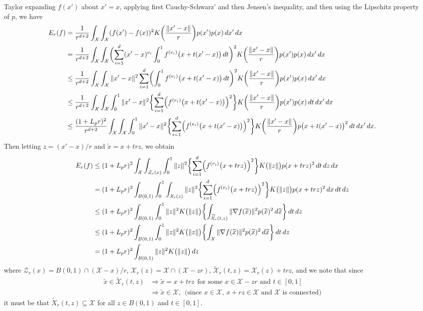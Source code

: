 \documentclass[twoside]{article}
\newcommand{\1}{\mathbf{1}}
\newcommand{\Xset}{\mathcal{X}}
\newcommand{\wt}[1]{\widetilde{#1}}
\theoremstyle{definition}
\theoremstyle{remark}
\begin{document}
Taylor expanding $f(x')$ about $x' = x$, applying first Cauchy-Schwarz' and then Jensen's inequality, and then using the Lipschitz property of $p$, we have
\begin{align*}
E_r(f) & = \frac{1}{r^{d + 2}}\int_{\Xset} \int_{\Xset} (f(x') - f(x))^2 K\biggl(\frac{\|x' - x\|}{r}\biggr) p(x') p(x) \,dx' \,dx \\
& = \frac{1}{r^{d + 2}}\int_{\Xset} \int_{\Xset} \biggl(\sum_{i = 1}^{d} (x' - x)^{e_i} \int_0^1 f^{(e_i)}\bigl(x + t(x' - x)\bigr) \,dt\biggr)^2 K\biggl(\frac{\|x' - x\|}{r}\biggr) p(x') p(x) \,dx' \,dx \\
& \leq \frac{1}{r^{d + 2}}\int_{\Xset} \int_{\Xset} \|x' - x\|^2 \sum_{i = 1}^{d}\biggl(\int_0^1 f^{(e_i)}\bigl(x + t(x' - x)\bigr) \,dt\biggr)^2 K\biggl(\frac{\|x' - x\|}{r}\biggr) p(x') p(x) \,dx' \,dx \\
& \leq \frac{1}{r^{d + 2}}\int_{\Xset} \int_{\Xset} \int_0^1   \|x' - x\|^2 \biggl\{\sum_{i = 1}^{d} \Bigl(f^{(e_i)}\bigl(x + t(x' - x)\bigr)\Bigr)^2\biggr\} K\biggl(\frac{\|x' - x\|}{r}\biggr) p(x') p(x)   \,dt   \,dx' \,dx \\
& \leq \frac{(1 + L_pr)^2}{r^{d + 2}}\int_{\Xset} \int_{\Xset} \int_0^1  \|x' - x\|^2 \biggl\{\sum_{i = 1}^{d} \Bigl(f^{(e_i)}\bigl(x + t(x' - x)\bigr)\Bigr)^2\biggr\} K\biggl(\frac{\|x' - x\|}{r}\biggr) p\bigl(x + t(x' - x)\bigr)^2   \,dt   \,dx' \,dx.
\end{align*} 
Then letting $z = (x' - x)/r$ and $\wt{x} = x + trz$, we obtain
\begin{align*}
E_r(f) & \leq (1 + L_pr)^2 \int_{\Xset} \int_{\mathcal{Z}_r(x)} \int_{0}^{1} \|z\|^2 \biggl\{\sum_{i = 1}^{d} \Bigl(f^{(e_i)}\bigl(x + trz\bigr)\Bigr)^2\biggr\} K\bigl(\|z\|\bigr) p(x + trz)^2 \,dt \,dz \,dx \\
& = (1 + L_pr)^2 \int_{B(0,1)} \int_{0}^{1}  \int_{\Xset_r(z)} \|z\|^2 \biggl\{\sum_{i = 1}^{d} \Bigl(f^{(e_i)}\bigl(x + trz\bigr)\Bigr)^2\biggr\} K\bigl(\|z\|\bigr) p(x + trz)^2 \,dx \,dt \,dz \\
& \leq (1 + L_pr)^2 \int_{B(0,1)} \int_{0}^{1} \|z\|^2 K\bigl(\|z\|\bigr) \biggl\{\int_{\wt{\Xset}_r(t,z)} \|\nabla f(\wt{x})\|^2 p(\wt{x})^2 \,d\wt{x}\biggr\} \,dt \,dz  \\
& \leq (1 + L_pr)^2 \int_{B(0,1)} \int_{0}^{1} \|z\|^2 K\bigl(\|z\|\bigr) \biggl\{\int_{\Xset} \|\nabla f(\wt{x})\|^2 p(\wt{x})^2 \,d\wt{x}\biggr\} \,dt \,dz \\
& = (1 + L_pr)^2 \int_{B(0,1)} \|z\|^2 K\bigl(\|z\|\bigr) \,dz 
\end{align*}
where $\mathcal{Z}_r(x) = B(0,1) \cap (\Xset - x)/r$, $\Xset_r(z) = \Xset \cap( \Xset - zr)$, $\wt{\Xset}_r(t,z) = \Xset_r(z) + trz$, and we note that since
\begin{align*}
\wt{x} \in \wt{\Xset}_r(t,z) & \Longrightarrow \wt{x} = x + trz ~~ \textrm{for some $x \in \Xset - zr$ and $t \in [0,1]$} \\
& \Longrightarrow \wt{x} \in \Xset,~~ \textrm{(since $x \in \Xset$, $x + rz \in \Xset$ and $\Xset$ is connected)}
\end{align*}
it must be that $\wt{X}_r(t,z) \subseteq \Xset$ for all $z \in B(0,1)$ and $t \in [0,1]$. 
\end{document}
